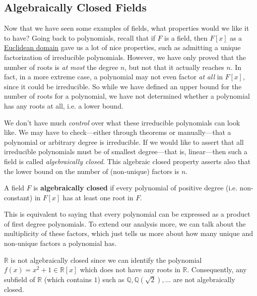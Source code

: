 \subsection{Algebraically Closed Fields} 

  Now that we have seen some examples of fields, what properties would we like it to have? Going back to polynomials, recall that if $F$ is a field, then $F[x]$ as a \hyperref[def:euclidean-domain]{Euclidean domain} gave us a lot of nice properties, such as admitting a unique factorization of irreducible polynomials. However, we have only proved that the number of roots is \textit{at most} the degree $n$, but not that it actually reaches $n$. In fact, in a more extreme case, a polynomial may not even factor \textit{at all} in $F[x]$, since it could be irreducible. So while we have defined an upper bound for the number of roots for a polynomial, we have not determined whether a polynomial has any roots at all, i.e. a lower bound. 

  We don't have much \textit{control} over what these irreducible polynomials can look like. We may have to check---either through theorems or manually---that a polynomial or arbitrary degree is irreducible. If we would like to assert that all irreducible polynomials must be of smallest degree---that is, linear---then such a field is called \textit{algebraically closed}. 
  This algebraic closed property asserts also that the lower bound on the number of (non-unique) factors is $n$. 

  \begin{definition}
    \label{def:algebraically-closed-field}
    A field $F$ is \textbf{algebraically closed} if every polynomial of positive degree (i.e. non-constant) in $F[x]$ has at least one root in $F$. 
  \end{definition}

  This is equivalent to saying that every polynomial can be expressed as a product of first degree polynomials. To extend our analysis more, we can talk about the multiplicity of these factors, which just tells us more about how many unique and non-unique factors a polynomial has. 

  \begin{example}
    \label{ex:reals-are-not-algebraically-closed}
    $\mathbb{R}$ is not algebraically closed since we can identify the polynomial $f(x) = x^2 + 1 \in \mathbb{R}[x]$ which does not have any roots in $\mathbb{R}$. Consequently, any subfield of $\mathbb{R}$ (which contains $1$) such as $\mathbb{Q}, \mathbb{Q}(\sqrt{2}), \ldots$ are not algebraically closed. 
  \end{example}

